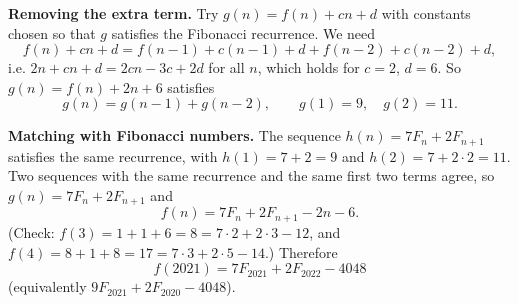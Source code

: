 \textbf{Removing the extra term.} Try $g(n)=f(n)+cn+d$ with constants chosen so that $g$ satisfies the Fibonacci recurrence. We need
\[f(n)+cn+d=f(n-1)+c(n-1)+d+f(n-2)+c(n-2)+d,\]
i.e. $2n+cn+d=2cn-3c+2d$ for all $n$, which holds for $c=2$, $d=6$. So $g(n)=f(n)+2n+6$ satisfies
\[g(n)=g(n-1)+g(n-2),\qquad g(1)=9,\quad g(2)=11.\]

\textbf{Matching with Fibonacci numbers.} The sequence $h(n)=7F_n+2F_{n+1}$ satisfies the same recurrence, with $h(1)=7+2=9$ and $h(2)=7+2\cdot2=11$. Two sequences with the same recurrence and the same first two terms agree, so $g(n)=7F_n+2F_{n+1}$ and
\[f(n)=7F_n+2F_{n+1}-2n-6.\]
(Check: $f(3)=1+1+6=8=7\cdot2+2\cdot3-12$, and $f(4)=8+1+8=17=7\cdot3+2\cdot5-14$.) Therefore
\[f(2021)=\boxed{7F_{2021}+2F_{2022}-4048}\]
(equivalently $9F_{2021}+2F_{2020}-4048$).
